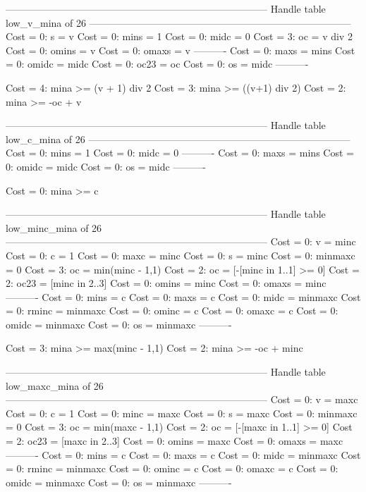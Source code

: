 --------------------------------------------------------------------------------
Handle table low_v_mina of 26
--------------------------------------------------------------------------------
Cost =  0:  s     = v
Cost =  0:  mins  = 1
Cost =  0:  midc  = 0
Cost =  3:  oc    = v div 2
Cost =  0:  omins = v
Cost =  0:  omaxs = v
----------
Cost =  0:  maxs  = mins
Cost =  0:  omidc = midc
Cost =  0:  oc23  = oc
Cost =  0:  os    = midc
----------

Cost =  4:  mina >= (v + 1) div 2
Cost =  3:  mina >= ((v+1) div 2)
Cost =  2:  mina >= -oc + v

--------------------------------------------------------------------------------
Handle table low_c_mina of 26
--------------------------------------------------------------------------------
Cost =  0:  mins  = 1
Cost =  0:  midc  = 0
----------
Cost =  0:  maxs  = mins
Cost =  0:  omidc = midc
Cost =  0:  os    = midc
----------

Cost =  0:  mina >= c

--------------------------------------------------------------------------------
Handle table low_minc_mina of 26
--------------------------------------------------------------------------------
Cost =  0:  v       = minc
Cost =  0:  c       = 1
Cost =  0:  maxc    = minc
Cost =  0:  s       = minc
Cost =  0:  minmaxc = 0
Cost =  3:  oc      = min(minc - 1,1)
Cost =  2:  oc      = [-[minc in 1..1] >= 0]
Cost =  2:  oc23    = [minc in 2..3]
Cost =  0:  omins   = minc
Cost =  0:  omaxs   = minc
----------
Cost =  0:  mins    = c
Cost =  0:  maxs    = c
Cost =  0:  midc    = minmaxc
Cost =  0:  rminc   = minmaxc
Cost =  0:  ominc   = c
Cost =  0:  omaxc   = c
Cost =  0:  omidc   = minmaxc
Cost =  0:  os      = minmaxc
----------

Cost =  3:  mina >= max(minc - 1,1)
Cost =  2:  mina >= -oc + minc

--------------------------------------------------------------------------------
Handle table low_maxc_mina of 26
--------------------------------------------------------------------------------
Cost =  0:  v       = maxc
Cost =  0:  c       = 1
Cost =  0:  minc    = maxc
Cost =  0:  s       = maxc
Cost =  0:  minmaxc = 0
Cost =  3:  oc      = min(maxc - 1,1)
Cost =  2:  oc      = [-[maxc in 1..1] >= 0]
Cost =  2:  oc23    = [maxc in 2..3]
Cost =  0:  omins   = maxc
Cost =  0:  omaxs   = maxc
----------
Cost =  0:  mins    = c
Cost =  0:  maxs    = c
Cost =  0:  midc    = minmaxc
Cost =  0:  rminc   = minmaxc
Cost =  0:  ominc   = c
Cost =  0:  omaxc   = c
Cost =  0:  omidc   = minmaxc
Cost =  0:  os      = minmaxc
----------

